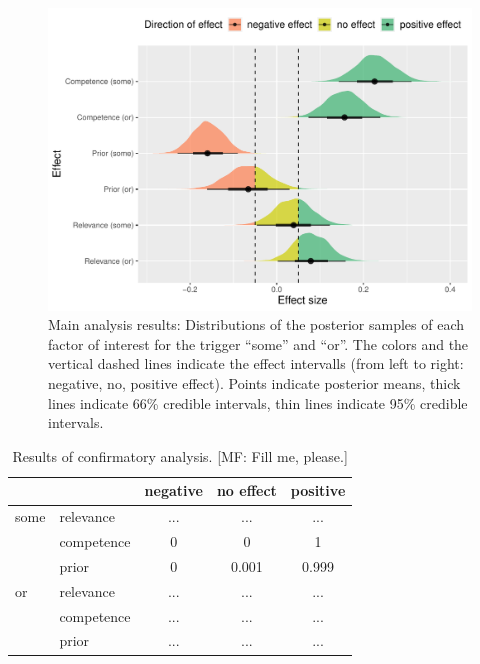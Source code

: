 \documentclass{sp}
\newcommand{\mf}[1]{\textcolor{BurntOrange}{[MF: #1]}}
\begin{document}
\begin{figure}[h]
	\begin{center}
		\includegraphics[width=1\linewidth]{images/posterior-effects-main.pdf}
	\end{center}
	\vspace{-0.3cm}
	\caption{Main analysis results: Distributions of the posterior samples of each factor of interest for the trigger ``some'' and ``or''. The colors and the vertical dashed lines indicate the effect intervalls (from left to right: negative, no, positive effect). Points indicate posterior means, thick lines indicate 66\% credible intervals, thin lines indicate 95\% credible intervals.}
	\label{posteriors-main}
\end{figure}

\begin{table}
  \centering
   \begin{tabular}{llccc}
           &            & negative & no effect & positive \\ \midrule
    {some} & relevance  & ...      & ...       & ...      \\
           & competence & 0        & 0         & 1        \\
           & prior      & 0        & 0.001     & 0.999    \\
    {or}   & relevance  & ...      & ...       & ...      \\
           & competence & ...      & ...       & ...      \\
           & prior      & ...      & ...       & ...      \\
   \end{tabular}
  \caption{Results of confirmatory analysis. \mf{Fill me, please.}}
  \label{tab:results-confirmatory}
\end{table}
\end{document}
